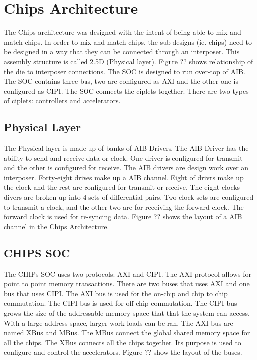 \documentclass[../main.tex]{subfiles}
\begin{document}
\section{Chips Architecture}
The Chips architecture was designed with the intent of being able to mix and match chips. In order to mix and match chips, the sub-designs (ie. chips) need to be designed in a way that they can be connected through an interposer. This assembly structure is called 2.5D (Physical layer). Figure ?? shows relationship of the die to interposer connections. The SOC is designed to run over-top of AIB. The SOC contains three bus, two are configured as AXI and the other one is configured as CIPI. The SOC connects the ciplets together. There are two types of ciplets: controllers and accelerators.

\subsection{Physical Layer}
The Physical layer is made up of banks of AIB Drivers. The AIB Driver has the ability to send and receive data or clock. One driver is configured for transmit and the other is configured for receive. The AIB drivers are design work over an interposer. Forty-eight drives make up a AIB channel. Eight of drivrs make up the clock and the rest are configured for transmit or receive. The eight clocks divers are broken up into 4 sets of differential pairs. Two clock sets are configured to transmit a clock, and the other two are for receiving the forward clock. The forward clock is used for re-syncing data. Figure ?? shows the layout of a AIB channel in the Chips Architecture.

\subsection{CHIPS SOC}
The CHIPs SOC uses two protocols: AXI and CIPI. The AXI protocol allows for point to point memory transactions. There are two buses that uses AXI and one bus that uses CIPI. The AXI bus is used for the on-chip and chip to chip commutation. The CIPI bus is used for off-chip commutation. The CIPI bus grows the size of the addressable memory space that that the system can access. With a large address space, larger work loads can be ran. The AXI bus are named XBus and MBus. The MBus connect the global shared memory space for all the chips. The XBus connects all the chips together. Its purpose is used to configure and control the accelerators. Figure ?? show the layout of the buses.
\end{document}
